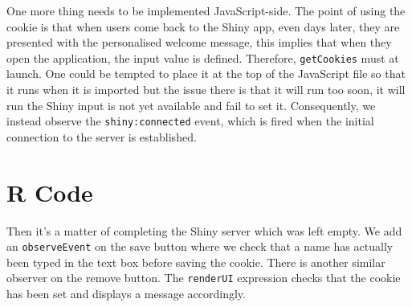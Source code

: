 \documentclass[10pt,]{krantz}
\makeatletter
\newenvironment{Shaded}{\begin{snugshade}}{\end{snugshade}}
\newcommand{\AttributeTok}[1]{\textcolor[rgb]{0.61,0.61,0.61}{#1}}
\newcommand{\CommentTok}[1]{\textcolor[rgb]{0.37,0.37,0.37}{\textit{#1}}}
\newcommand{\KeywordTok}[1]{\textcolor[rgb]{0.27,0.27,0.27}{\textbf{#1}}}
\newcommand{\NormalTok}[1]{#1}
\newcommand{\OperatorTok}[1]{\textcolor[rgb]{0.43,0.43,0.43}{\textbf{#1}}}
\newcommand{\StringTok}[1]{\textcolor[rgb]{0.5,0.5,0.5}{#1}}
\newenvironment{kframe}{%
\medskip{}
\setlength{\fboxsep}{.8em}
 \def\at@end@of@kframe{}%
 \ifinner\ifhmode%
  \def\at@end@of@kframe{\end{minipage}}%
  \begin{minipage}{\columnwidth}%
 \fi\fi%
 \def\FrameCommand##1{\hskip\@totalleftmargin \hskip-\fboxsep
 \colorbox{shadecolor}{##1}\hskip-\fboxsep
     \hskip-\linewidth \hskip-\@totalleftmargin \hskip\columnwidth}%
 \MakeFramed {\advance\hsize-\width
   \@totalleftmargin\z@ \linewidth\hsize
   \@setminipage}}%
 {\par\unskip\endMakeFramed%
 \at@end@of@kframe}
\renewenvironment{Shaded}{\begin{kframe}}{\end{kframe}}
\makeatother
\begin{document}
One more thing needs to be implemented JavaScript-side. The point of using the cookie is that when users come back to the Shiny app, even days later, they are presented with the personalised welcome message, this implies that when they open the application, the input value is defined. Therefore, \texttt{getCookies} must at launch. One could be tempted to place it at the top of the JavaScript file so that it runs when it is imported but the issue there is that it will run too soon, it will run the Shiny input is not yet available and fail to set it. Consequently, we instead observe the \texttt{shiny:connected} event, which is fired when the initial connection to the server is established.

\begin{Shaded}
\end{Shaded}

\hypertarget{shiny-cookies-r-code}{%
\section{R Code}\label{shiny-cookies-r-code}}

Then it's a matter of completing the Shiny server which was left empty. We add an \texttt{observeEvent} on the save button where we check that a name has actually been typed in the text box before saving the cookie. There is another similar observer on the remove button. The \texttt{renderUI} expression checks that the cookie has been set and displays a message accordingly.
\end{document}
